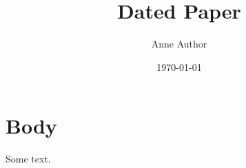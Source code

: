 \documentclass{article}
\title{Dated Paper}
\author{Anne Author}
\date{\today}
\begin{document}
\maketitle
\section{Body}
Some text.
\end{document}
